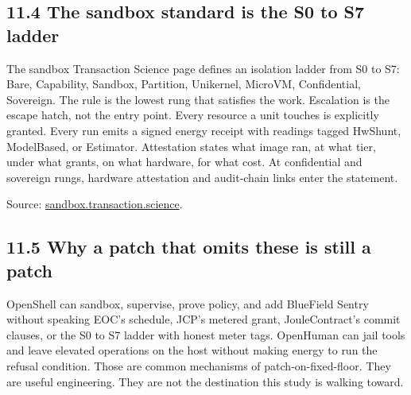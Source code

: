 \documentclass[10pt,letterpaper]{article}
\begin{document}
\subsection{11.4 The sandbox standard is the S0 to S7
ladder}\label{the-sandbox-standard-is-the-s0-to-s7-ladder}

The sandbox Transaction Science page defines an isolation ladder from S0
to S7: Bare, Capability, Sandbox, Partition, Unikernel, MicroVM,
Confidential, Sovereign. The rule is the lowest rung that satisfies the
work. Escalation is the escape hatch, not the entry point. Every
resource a unit touches is explicitly granted. Every run emits a signed
energy receipt with readings tagged HwShunt, ModelBased, or Estimator.
Attestation states what image ran, at what tier, under what grants, on
what hardware, for what cost. At confidential and sovereign rungs,
hardware attestation and audit-chain links enter the statement.

Source:
\href{https://sandbox.transaction.science/}{sandbox.transaction.science}.

\subsection{11.5 Why a patch that omits these is still a
patch}\label{why-a-patch-that-omits-these-is-still-a-patch}

OpenShell can sandbox, supervise, prove policy, and add BlueField Sentry
without speaking EOC's schedule, JCP's metered grant, JouleContract's
commit clauses, or the S0 to S7 ladder with honest meter tags. OpenHuman
can jail tools and leave elevated operations on the host without making
energy to run the refusal condition. Those are common mechanisms of
patch-on-fixed-floor. They are useful engineering. They are not the
destination this study is walking toward.
\end{document}
